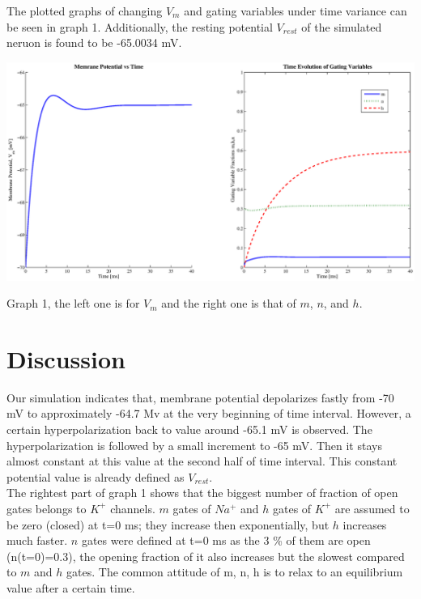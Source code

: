 \documentclass{article}
\begin{document}
The plotted graphs of changing $V_{m}$ and gating variables under time variance can be seen in graph 1. Additionally, the resting potential $V_{rest}$ of the simulated neruon is found to be -65.0034 mV.

\begin{center}
 \includegraphics[width=\textwidth]{figur1.eps}
\begin{footnotesize}Graph 1, the left one is for $V_{m}$ and the right one is that of $m$, $n$, and $h$. \end{footnotesize}
\end{center}
\section{Discussion}
Our simulation indicates that, membrane potential depolarizes fastly from -70 mV to approximately -64.7 Mv at the very beginning of time interval. However, a certain hyperpolarization back to value around -65.1 mV is observed. The hyperpolarization is followed by a small increment to -65 mV. Then it stays almost constant at this value at the second half of time interval. This constant potential value is already defined as $V_{rest}$.\\

The rightest part of graph 1 shows that the biggest number of fraction of open gates belongs to $K^+$ channels. $m$ gates of $Na^+$ and $h$ gates of $K^+$ are assumed to be zero (closed) at t=0 ms; they increase then exponentially, but $h$ increases much faster. $n$ gates were defined at t=0 ms as the 3 \% of them are open (n(t=0)=0.3), the opening fraction of it also increases but the slowest compared to $m$ and $h$ gates. The common attitude of m, n, h is to relax to an equilibrium value after a certain time.\\ 
\end{document}
